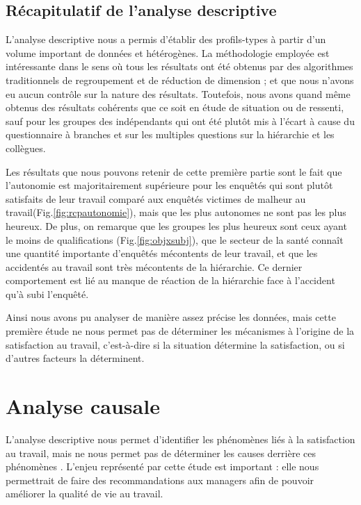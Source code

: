 \documentclass[11pt,fleqn,openany,frenchb]{book} %
\begin{document}
\section{Récapitulatif de l'analyse descriptive}
L'analyse descriptive nous a permis d'établir des profils-types à partir d'un volume important de données et hétérogènes. La méthodologie employée est intéressante dans le sens où tous les résultats ont été obtenus par des algorithmes traditionnels de regroupement et de réduction de dimension ; et que nous n'avons eu aucun contrôle sur la nature des résultats. Toutefois, nous avons quand même obtenus des résultats cohérents que ce soit en étude de situation ou de ressenti, sauf pour les groupes des indépendants qui ont été plutôt mis à l'écart à cause du questionnaire à branches et sur les multiples questions sur la hiérarchie et les collègues.\par	
Les résultats que nous pouvons retenir de cette première partie sont le fait que l'autonomie est majoritairement supérieure pour les enquêtés qui sont plutôt satisfaits de leur travail comparé aux enquêtés victimes de malheur au travail(Fig.\ref{fig:rcpautonomie}), mais que les plus autonomes ne sont pas les plus heureux. De plus, on remarque que les groupes les plus heureux sont ceux ayant le moins de qualifications (Fig.\ref{fig:objxsubj}), que le secteur de la santé connaît une quantité importante d'enquêtés mécontents de leur travail, et que les accidentés au travail sont très mécontents de la hiérarchie. Ce dernier comportement est lié au manque de réaction de la hiérarchie face à l'accident qu'à subi l'enquêté.\par
Ainsi nous avons pu analyser de manière assez précise les données, mais cette première étude ne nous permet pas de déterminer les mécanismes à l'origine de la satisfaction au travail, c'est-à-dire si la situation détermine la satisfaction, ou si d'autres facteurs la déterminent.
\chapter{Analyse causale}
L'analyse descriptive nous permet d'identifier les phénomènes liés à la satisfaction au travail, mais ne nous permet pas de déterminer les causes derrière ces phénomènes  \cite{pearl2000causal}. L'enjeu représenté par cette étude est important : elle nous permettrait de faire des recommandations aux managers afin de pouvoir améliorer la qualité de vie au travail.\par
 
\end{document}
